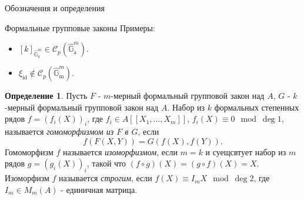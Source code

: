 \documentclass[a4paper,14pt]{extarticle}
\theoremstyle{definition}
\newtheorem{definition}{Определение}[section]
\newcommand{\id}{\mathrm{id}}
\newcommand{\bG}{\mathbb{G}}
\newcommand{\sC}{\mathscr{C}}
\newcommand{\GGa}{\hat{\bG}_{\mathrm{a}}}
\newcommand{\GGm}{\hat{\bG}_{\mathrm{m}}}
\begin{document}
\begin{section}{Обозначения и определения}
\begin{subsection}{Формальные групповые законы}
Примеры:
\begin{itemize}
    \item ${ [k]_{\GGa^m} \in \sC_p(\GGa^m) }$.
    \item ${ \xi_\id \not\in \sC_p(\GGm^m) }$.
\end{itemize}

\begin{definition}\label{def:2.1:formal_group_hom}
    Пусть $F$ - $m$-мерный формальный групповой закон над $A$, $G$ - $k$-мерный формальный групповой закон над $A$. Набор из $k$ формальных степенных рядов ${ f = (f_i(X))_i }$, где ${ f_i \in A[[X_1, ..., X_m]] }$, ${ f_i(X) \equiv 0 \mod \deg 1 }$, называется \textit{гомоморфизмом из $F$ в $G$}, если
    \begin{equation*}
        f(F(X, Y)) = G(f(X), f(Y)).
    \end{equation*}
    Гомоморфизм $f$ называется \textit{изоморфизмом}, если ${ m = k }$ и суещсвтует набор из $m$ рядов ${ g = (g_i(X))_i }$, такой что ${ (f \circ g)(X) = (g \circ f)(X) = X }$. Изоморфизм $f$ называется \textit{строгим}, если ${ f(X) \equiv I_m X \mod \deg 2 }$, где ${ I_m \in M_m(A) }$ - единичная матрица.
\end{definition}


\end{subsection}
\end{section}
\end{document}
